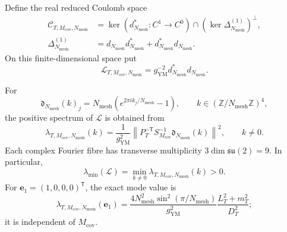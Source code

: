 Define the real reduced Coulomb space
\begin{align}
 \mathscr C_{T,M_{\mathrm{cov}},N_{\mathrm{mesh}}}
 &=
 \ker(d_{N_{\mathrm{mesh}}}^*:C^1\to C^0)
 \cap
 \left(\ker\Delta^{(1)}_{N_{\mathrm{mesh}}}\right)^\perp,
 \label{cusp-link-reduced-coulomb-space}\\
 \Delta^{(1)}_{N_{\mathrm{mesh}}}
 &=d_{N_{\mathrm{mesh}}}d_{N_{\mathrm{mesh}}}^*
 +d_{N_{\mathrm{mesh}}}^*d_{N_{\mathrm{mesh}}}.
 \label{cusp-link-finite-hodge-laplacian}
\end{align}
On this finite-dimensional space put
\begin{equation}
 \mathcal L_{T,M_{\mathrm{cov}},N_{\mathrm{mesh}}}
 =g_{\mathrm{YM}}^{-2}d_{N_{\mathrm{mesh}}}^*
                         d_{N_{\mathrm{mesh}}}.
 \label{cusp-link-finite-hessian}
\end{equation}

\begin{proposition}
\label{cusp-link-finite-spectrum}
For
\begin{equation}
 \mathfrak d_{N_{\mathrm{mesh}}}(k)_j
 =N_{\mathrm{mesh}}
  \left(e^{2\pi i k_j/N_{\mathrm{mesh}}}-1\right),
 \qquad
 k\in(\mathbb Z/N_{\mathrm{mesh}}\mathbb Z)^4,
 \label{cusp-link-fourier-symbol}
\end{equation}
the positive spectrum of \(\mathcal L\) is obtained from
\begin{equation}
 \lambda_{T,M_{\mathrm{cov}},N_{\mathrm{mesh}}}(k)
 =\frac1{g_{\mathrm{YM}}^2}
  \left\lVert
   P_T^{-\mathsf T}S_{M_{\mathrm{cov}}}^{-1}
   \mathfrak d_{N_{\mathrm{mesh}}}(k)
  \right\rVert^2,
 \qquad k\neq0.
 \label{cusp-link-finite-mode-eigenvalue}
\end{equation}
Each complex Fourier fibre has transverse multiplicity
\(3\dim\mathfrak{su}(2)=9\).  In particular,
\begin{equation}
 \lambda_{\min}(\mathcal L)
 =\min_{k\neq0}\lambda_{T,M_{\mathrm{cov}},N_{\mathrm{mesh}}}(k)>0.
 \label{cusp-link-finite-minimum}
\end{equation}
For \(\mathbf e_1=(1,0,0,0)^{\mathsf T}\), the exact mode value is
\begin{equation}
 \lambda_{T,M_{\mathrm{cov}},N_{\mathrm{mesh}}}(\mathbf e_1)
 =\frac{4N_{\mathrm{mesh}}^2
              \sin^2(\pi/N_{\mathrm{mesh}})}{g_{\mathrm{YM}}^2}
  \frac{L_T^2+m_T^2}{D_T^2};
 \label{cusp-link-cover-soft-mode}
\end{equation}
it is independent of \(M_{\mathrm{cov}}\).
\end{proposition}

